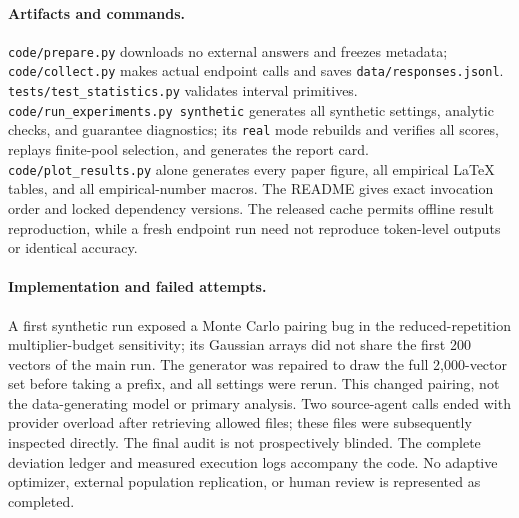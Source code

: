 \documentclass{article}
\begin{document}
\paragraph{Artifacts and commands.}
\texttt{code/prepare.py} downloads no external answers and freezes metadata; \texttt{code/collect.py} makes actual endpoint calls and saves \texttt{data/responses.jsonl}. \texttt{tests/test\_statistics.py} validates interval primitives. \texttt{code/run\_experiments.py synthetic} generates all synthetic settings, analytic checks, and guarantee diagnostics; its \texttt{real} mode rebuilds and verifies all scores, replays finite-pool selection, and generates the report card. \texttt{code/plot\_results.py} alone generates every paper figure, all empirical LaTeX tables, and all empirical-number macros. The README gives exact invocation order and locked dependency versions. The released cache permits offline result reproduction, while a fresh endpoint run need not reproduce token-level outputs or identical accuracy.

\paragraph{Implementation and failed attempts.}
A first synthetic run exposed a Monte Carlo pairing bug in the reduced-repetition multiplier-budget sensitivity; its Gaussian arrays did not share the first 200 vectors of the main run. The generator was repaired to draw the full 2,000-vector set before taking a prefix, and all settings were rerun. This changed pairing, not the data-generating model or primary analysis. Two source-agent calls ended with provider overload after retrieving allowed files; these files were subsequently inspected directly. The final audit is not prospectively blinded. The complete deviation ledger and measured execution logs accompany the code. No adaptive optimizer, external population replication, or human review is represented as completed.
\end{document}
